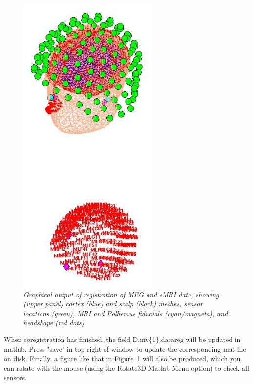 \begin{figure}
\begin{center}
\includegraphics[width=70mm]{multimodal/figures/figure_32_17}
\caption{\em  Graphical output of registration of MEG and sMRI data, showing (upper panel) cortex (blue) and scalp (black) meshes, sensor locations (green), MRI and Polhemus fiducials (cyan/magneta), and headshape (red dots).\label{fig_32_17}}
\end{center}
\end{figure}

When coregistration has finished, the field D.inv\{1\}.datareg will be updated in matlab. Press "save" in top right of window to update the corresponding mat file on disk. Finally, a figure like that in Figure~\ref{fig_32_17} will also be produced, which you can rotate with the mouse (using the Rotate3D Matlab Menu option) to check all sensors.

